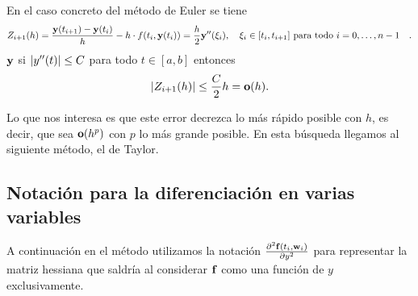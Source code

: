 

\begin{example}
    En el caso concreto del método de Euler se tiene
    \begin{equation*}
        Z_{i+1}(h) =
        \frac{\vy(t_{i+1}) - \vy(t_i)}{h} - h\cdot f(t_i,\vy(t_i)) =
        \frac{h}{2} \vy''(\xi_i),
            \qq{$\xi_i \in [t_i, t_{i+1}]$ para todo $i=0,\dots, n-1$}.
    \end{equation*}
    $\vb{y}$ si $\abs{y''(t)} \le C$ para todo $t \in [a, b]$ entonces
    \begin{equation*}
        \abs{Z_{i+1}(h)} \le \frac{C}{2}h = \vb{o}(h).
    \end{equation*}

    Lo que nos interesa es que este error
    decrezca lo más rápido posible con $h$,
    es decir, que sea $\vb{o}(h^p)$ con $p$ lo más grande posible.
    En esta búsqueda llegamos al siguiente método, el de Taylor.
\end{example}

\subsection{Notación para la diferenciación en varias variables}

A continuación en el método utilizamos la notación
$\pdv[2]{\vb{f}(t_i, \vb{w}_i)}{y}$
para representar la matriz hessiana que saldría al considerar $\vb{f}$
como una función de $y$ exclusivamente.


